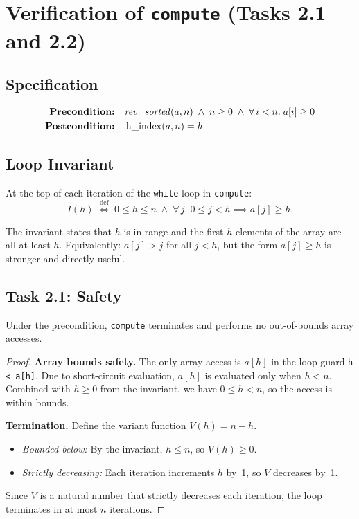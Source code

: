 \section{Verification of \texttt{compute} (Tasks 2.1 and 2.2)}
\label{sec:compute}

\subsection{Specification}

\begin{align*}
  \textbf{Precondition:}\quad & \mathit{rev\_sorted}(a, n) \;\wedge\; n \geq 0
    \;\wedge\; \forall\, i < n.\; a[i] \geq 0 \\
  \textbf{Postcondition:}\quad & \operatorname{h\_index}(a, n) = h
\end{align*}

\subsection{Loop Invariant}

\begin{invariant}\label{inv:compute}
At the top of each iteration of the \texttt{while} loop in \texttt{compute}:
\[
  I(h) \;\stackrel{\text{def}}{\iff}\;
  0 \leq h \leq n \;\wedge\; \forall\, j.\; 0 \leq j < h \implies a[j] \geq h.
\]
\end{invariant}

\begin{remark}
The invariant states that $h$ is in range and the first $h$ elements of the array
are all at least $h$. Equivalently: $a[j] > j$ for all $j < h$, but the form
$a[j] \geq h$ is stronger and directly useful.
\end{remark}

\subsection{Task 2.1: Safety}

\begin{theorem}\label{thm:compute-safety}
Under the precondition, \texttt{compute} terminates and performs no out-of-bounds
array accesses.
\end{theorem}

\begin{proof}
\textbf{Array bounds safety.}
The only array access is $a[h]$ in the loop guard \texttt{h < a[h]}.
Due to short-circuit evaluation, $a[h]$ is evaluated only when $h < n$.
Combined with $h \geq 0$ from the invariant, we have $0 \leq h < n$,
so the access is within bounds.

\textbf{Termination.}
Define the variant function $V(h) = n - h$.
\begin{itemize}
  \item \emph{Bounded below:} By the invariant, $h \leq n$, so $V(h) \geq 0$.
  \item \emph{Strictly decreasing:} Each iteration increments $h$ by~1,
    so $V$ decreases by~1.
\end{itemize}
Since $V$ is a natural number that strictly decreases each iteration,
the loop terminates in at most $n$ iterations.
\end{proof}

